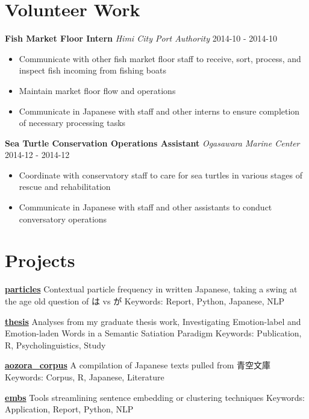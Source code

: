 \documentclass[a4paper,9pt]{extarticle}
\begin{document}
\section*{Volunteer Work}

\noindent
\textbf{Fish Market Floor Intern}
\noindent
\textit{Himi City Port Authority} \hfill 2014-10 - 2014-10
\begin{itemize}
\item Communicate with other fish market floor staff to receive, sort, process, and inspect fish incoming from fishing boats
\item Maintain market floor flow and operations
\item Communicate in Japanese with staff and other interns to ensure completion of necessary processing tasks
\end{itemize}

\noindent
\textbf{Sea Turtle Conservation Operations Assistant}
\noindent
\textit{Ogasawara Marine Center} \hfill 2014-12 - 2014-12
\begin{itemize}
\item Coordinate with conservatory staff to care for sea turtles in various stages of rescue and rehabilitation
\item Communicate in Japanese with staff and other assistants to conduct conversatory operations
\end{itemize}

\section*{Projects}

\noindent
\textbf{\href{https://github.com/ryancahildebrandt/particles}{particles}}
Contextual particle frequency in written Japanese, taking a swing at the age old question of は vs が
Keywords: Report, Python, Japanese, NLP

\noindent
\textbf{\href{https://github.com/ryancahildebrandt/thesis}{thesis}}
Analyses from my graduate thesis work, Investigating Emotion-label and Emotion-laden Words in a Semantic Satiation Paradigm
Keywords: Publication, R, Psycholinguistics, Study

\noindent
\textbf{\href{https://github.com/ryancahildebrandt/aozora_corpus}{aozora{\_}corpus}}
A compilation of Japanese texts pulled from 青空文庫
Keywords: Corpus, R, Japanese, Literature

\noindent
\textbf{\href{https://github.com/ryancahildebrandt/embs}{embs}}
Tools streamlining sentence embedding or clustering techniques
Keywords: Application, Report, Python, NLP
\end{document}
